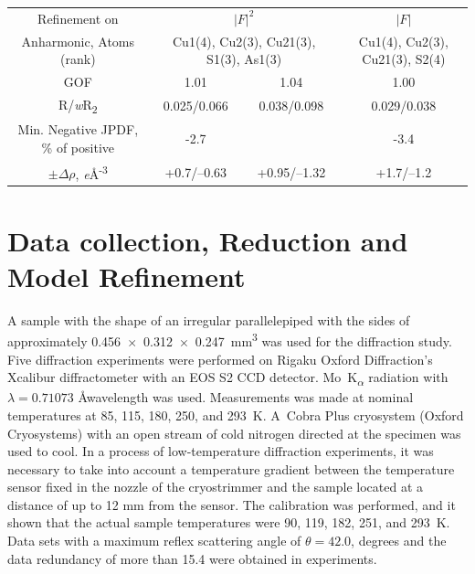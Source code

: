 \documentclass[preprint,review,12pt]{elsarticle}
\begin{document}
\begin{table}
{\begin{tabular}{cccc}
Refinement on                                              & \multicolumn{2}{c}{$|F|^2$}	                                	             & $|F|$	\\
Anharmonic, Atoms (rank)                                   & \multicolumn{2}{c}{Cu1(4), Cu2(3), Cu21(3), S1(3), As1(3)}	  	             & Cu1(4), Cu2(3), Cu21(3), S2(4)	\\
GOF                                                        & 1.01	                                                       & 1.04	         & 1.00	\\
R/{\it w}R\textsubscript{2}                                & 0.025/0.066	                                               & 0.038/0.098	 & 0.029/0.038	\\
Min. Negative JPDF, \% of positive                         & -2.7	                                                       & 	             & -3.4	\\
$\pm\Delta\rho$, {\it e}\AA\textsuperscript{-3}            & +0.7/–0.63	                                                 & +0.95/–1.32	 & +1.7/–1.2	\\


\end{tabular}}
\end{table}


\section{Data collection, Reduction and Model Refinement}\label{sec:level1}
A sample with the shape of an irregular parallelepiped with the sides of approximately 0.456~$\times$~0.312~$\times$~0.247~mm\textsuperscript{3} was used for the diffraction study. Five diffraction experiments were performed on Rigaku Oxford Diffraction's Xcalibur diffractometer with an EOS S2 CCD detector. Mo~K\textsubscript{$\alpha$} radiation with  $\lambda=0.71073$ \AA  wavelength was used. Measurements was made at nominal temperatures at
85, 115, 180, 250, and 293~K.
A~Cobra Plus cryosystem (Oxford Cryosystems) with an open stream of cold nitrogen directed at the specimen was used to cool.
In a process of low-temperature diffraction experiments, it was necessary to take into account a temperature gradient between the temperature sensor fixed in the nozzle of the cryostrimmer and the sample located at a distance of up to 12 mm from the sensor.
The calibration was performed\cite{Dudka2016_2}, and it shown that the actual sample temperatures were 90, 119, 182, 251, and 293~K. Data sets with a maximum reflex scattering angle of $\theta=42.0$, degrees and the data redundancy of more than 15.4 were obtained in experiments.
\end{document}
